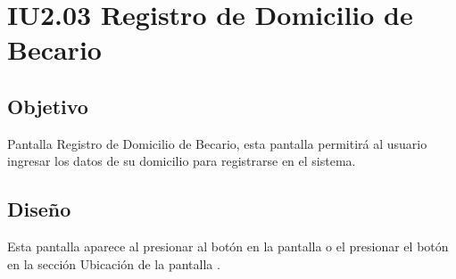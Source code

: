 \newpage
\section{IU2.03 Registro de Domicilio de Becario}

\subsection{Objetivo}
	Pantalla Registro de Domicilio de Becario, esta pantalla permitirá al usuario ingresar los datos de su domicilio para registrarse en el sistema.
	


\subsection{Diseño}
    Esta pantalla aparece al presionar al botón  en la pantalla  o 	el presionar el botón  en la sección Ubicación de la pantalla .

	
